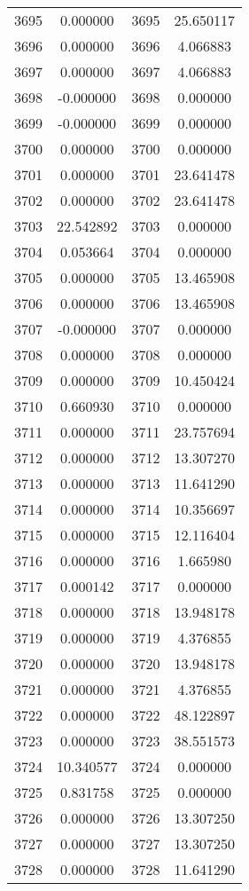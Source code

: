 \documentclass[12pt]{article}
\begin{document}
\begin{longtable}{@{}cccc@{}}
3695 & 0.000000 & 3695 & 25.650117 \\
3696 & 0.000000 & 3696 & 4.066883 \\
3697 & 0.000000 & 3697 & 4.066883 \\
3698 & -0.000000 & 3698 & 0.000000 \\
3699 & -0.000000 & 3699 & 0.000000 \\
3700 & 0.000000 & 3700 & 0.000000 \\
3701 & 0.000000 & 3701 & 23.641478 \\
3702 & 0.000000 & 3702 & 23.641478 \\
3703 & 22.542892 & 3703 & 0.000000 \\
3704 & 0.053664 & 3704 & 0.000000 \\
3705 & 0.000000 & 3705 & 13.465908 \\
3706 & 0.000000 & 3706 & 13.465908 \\
3707 & -0.000000 & 3707 & 0.000000 \\
3708 & 0.000000 & 3708 & 0.000000 \\
3709 & 0.000000 & 3709 & 10.450424 \\
3710 & 0.660930 & 3710 & 0.000000 \\
3711 & 0.000000 & 3711 & 23.757694 \\
3712 & 0.000000 & 3712 & 13.307270 \\
3713 & 0.000000 & 3713 & 11.641290 \\
3714 & 0.000000 & 3714 & 10.356697 \\
3715 & 0.000000 & 3715 & 12.116404 \\
3716 & 0.000000 & 3716 & 1.665980 \\
3717 & 0.000142 & 3717 & 0.000000 \\
3718 & 0.000000 & 3718 & 13.948178 \\
3719 & 0.000000 & 3719 & 4.376855 \\
3720 & 0.000000 & 3720 & 13.948178 \\
3721 & 0.000000 & 3721 & 4.376855 \\
3722 & 0.000000 & 3722 & 48.122897 \\
3723 & 0.000000 & 3723 & 38.551573 \\
3724 & 10.340577 & 3724 & 0.000000 \\
3725 & 0.831758 & 3725 & 0.000000 \\
3726 & 0.000000 & 3726 & 13.307250 \\
3727 & 0.000000 & 3727 & 13.307250 \\
3728 & 0.000000 & 3728 & 11.641290 \\

\end{longtable}
\end{document}
